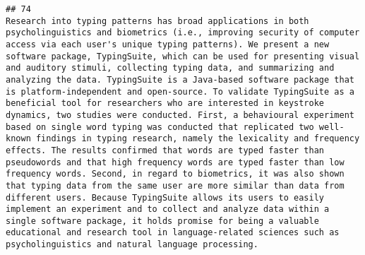 \documentclass[
  english,
  man]{apa6}
\begin{document}
\begin{verbatim}
## 74                                                                                                                                                                                                                                                                                                                                                                                                                                                                                                                                                                                                                                                                                                                                                                                                                                                                                                                                                                                                                                                                                                                                                                                                                                                                                               Research into typing patterns has broad applications in both psycholinguistics and biometrics (i.e., improving security of computer access via each user's unique typing patterns). We present a new software package, TypingSuite, which can be used for presenting visual and auditory stimuli, collecting typing data, and summarizing and analyzing the data. TypingSuite is a Java-based software package that is platform-independent and open-source. To validate TypingSuite as a beneficial tool for researchers who are interested in keystroke dynamics, two studies were conducted. First, a behavioural experiment based on single word typing was conducted that replicated two well-known findings in typing research, namely the lexicality and frequency effects. The results confirmed that words are typed faster than pseudowords and that high frequency words are typed faster than low frequency words. Second, in regard to biometrics, it was also shown that typing data from the same user are more similar than data from different users. Because TypingSuite allows its users to easily implement an experiment and to collect and analyze data within a single software package, it holds promise for being a valuable educational and research tool in language-related sciences such as psycholinguistics and natural language processing.

\end{verbatim}
\end{document}
